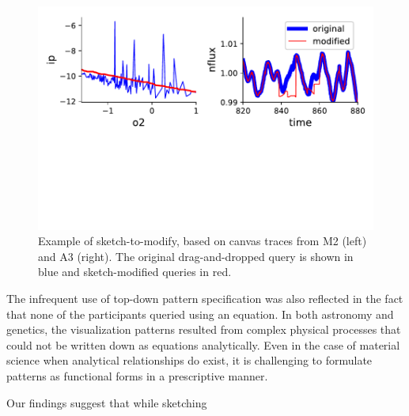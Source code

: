  \begin{figure}[h!]
     \centering
     \includegraphics[width=0.8\columnwidth]{figures/QueryModificationBySketch.pdf}
     \caption{Example of sketch-to-modify, based on canvas traces from M2 (left) and A3 (right). The original drag-and-dropped query is shown in blue and sketch-modified queries in red.}%
     \label{query_modification}
     \vspace{-10pt}
 \end{figure}
 \par The infrequent use of top-down pattern
 specification was also reflected in the fact
 that none of the participants queried using an equation.
 In both astronomy and genetics, the visualization patterns
 resulted from complex physical processes
 that could not be written down as equations analytically.
 Even in the case of material science when analytical
 relationships do exist, it is challenging to formulate patterns as functional forms in a prescriptive manner.
 \par Our findings suggest that while sketching
